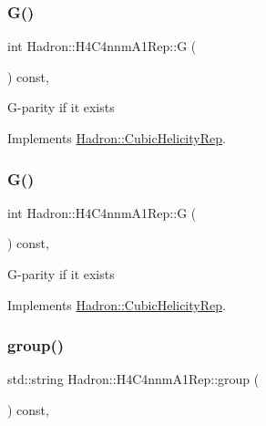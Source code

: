 \subsubsection{\texorpdfstring{G()}{G()}\hspace{0.1cm}{\footnotesize\ttfamily [1/2]}}
{\footnotesize\ttfamily int Hadron\+::\+H4\+C4nnm\+A1\+Rep\+::G (\begin{DoxyParamCaption}{ }\end{DoxyParamCaption}) const\hspace{0.3cm}{\ttfamily [inline]}, {\ttfamily [virtual]}}

G-\/parity if it exists 

Implements \mbox{\hyperlink{structHadron_1_1CubicHelicityRep_a50689f42be1e6170aa8cf6ad0597018b}{Hadron\+::\+Cubic\+Helicity\+Rep}}.

\mbox{\label{structHadron_1_1H4C4nnmA1Rep_a300704aab920eec248013b3e0ca1f53a}} 
\subsubsection{\texorpdfstring{G()}{G()}\hspace{0.1cm}{\footnotesize\ttfamily [2/2]}}
{\footnotesize\ttfamily int Hadron\+::\+H4\+C4nnm\+A1\+Rep\+::G (\begin{DoxyParamCaption}{ }\end{DoxyParamCaption}) const\hspace{0.3cm}{\ttfamily [inline]}, {\ttfamily [virtual]}}

G-\/parity if it exists 

Implements \mbox{\hyperlink{structHadron_1_1CubicHelicityRep_a50689f42be1e6170aa8cf6ad0597018b}{Hadron\+::\+Cubic\+Helicity\+Rep}}.

\mbox{\label{structHadron_1_1H4C4nnmA1Rep_a6434db04654db0e72689cb23155ce5c7}} 
\subsubsection{\texorpdfstring{group()}{group()}\hspace{0.1cm}{\footnotesize\ttfamily [1/3]}}
{\footnotesize\ttfamily std\+::string Hadron\+::\+H4\+C4nnm\+A1\+Rep\+::group (\begin{DoxyParamCaption}{ }\end{DoxyParamCaption}) const\hspace{0.3cm}{\ttfamily [inline]}, {\ttfamily [virtual]}}

